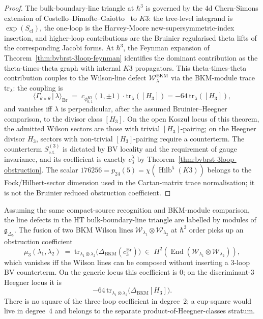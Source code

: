 \begin{proof}
The bulk-boundary-line triangle at $\hbar^3$ is governed by the
$4$d Chern-Simons extension of
Costello--Dimofte--Gaiotto~\cite{CostelloDimofteGaiotto2020} to $K3$:
the tree-level integrand is $\exp(S_{\mathrm{cl}})$, the one-loop is the
Harvey-Moore new-supersymmetric-index insertion, and higher-loop
contributions are the Bruinier regularised theta lifts of the
corresponding Jacobi forms. At $\hbar^3$, the Feynman expansion of
Theorem~\ref{thm:bvbrst-3loop-feynman} identifies the dominant
contribution as the theta-times-theta graph with internal $K3$
propagators. This theta-times-theta contribution couples to the
Wilson-line defect $\mathcal{W}^{\mathrm{BKM}}_\lambda$ via the
BKM-module trace $\mathrm{tr}_\lambda$: the coupling is
\[
 \langle \Gamma_{\theta\times\theta}\,|\,\lambda\rangle_{\mathrm{Br}}
 \;=\;
	 c_{\phi_{0,1}^{K3}}(1,\pm1)\cdot\mathrm{tr}_\lambda([H_3])
	 = -64\,\mathrm{tr}_\lambda([H_3]),
\]
and vanishes iff $\lambda$ is perpendicular, after the assumed
Bruinier--Heegner comparison, to the divisor class $[H_3]$. On the open
Koszul locus of this theorem, the admitted Wilson sectors are those
with trivial $[H_3]$-pairing; on the Heegner divisor $H_3$, sectors
with non-trivial $[H_3]$-pairing require a counterterm. The counterterm
$S^{(3)}_{\mathrm{c.t.}}$ is dictated by
BV locality and the requirement of gauge invariance, and its
coefficient is exactly $c_3^\lambda$ by
Theorem~\ref{thm:bvbrst-3loop-obstruction}. The scalar
$176256=p_{24}(5)=\chi(\operatorname{Hilb}^5(K3))$ belongs to the
Fock/Hilbert-sector dimension used in the Cartan-matrix trace
normalisation; it is not the Bruinier reduced obstruction coefficient.
\end{proof}

\begin{corollary}
\label{cor:htbb-core-wilson-BKM}
Assuming the same compact-source recognition and BKM-module comparison,
the line defects in the HT bulk-boundary-line triangle are labelled
by modules of $\mathfrak{g}_{\Delta_5}$. The fusion of two BKM Wilson
lines $\mathcal{W}_{\lambda_1}\otimes\mathcal{W}_{\lambda_2}$ at
$\hbar^3$ order picks up an obstruction coefficient
\[
 \mu_3(\lambda_1, \lambda_2)
 \;=\;
 \mathrm{tr}_{\lambda_1\otimes\lambda_2}
 \bigl(\Delta_{\mathrm{BKM}}(c^{\mathrm{Br}}_3)\bigr)
 \;\in\;
 H^2\!\left(
 \operatorname{End}(
 \mathcal{W}_{\lambda_1}\otimes\mathcal{W}_{\lambda_2})
 \right),
\]
which vanishes iff the Wilson lines can be composed without inserting
a $3$-loop BV counterterm. On the generic locus this coefficient is
$0$; on the discriminant-$3$ Heegner locus it is
\[
	 -64\,
 \mathrm{tr}_{\lambda_1\otimes\lambda_2}
 \bigl(\Delta_{\mathrm{BKM}}[H_3]\bigr).
\]
There is no square of the three-loop coefficient in degree~$2$; a
cup-square would live in degree~$4$ and belongs to the separate
product-of-Heegner-classes stratum.
\end{corollary}

